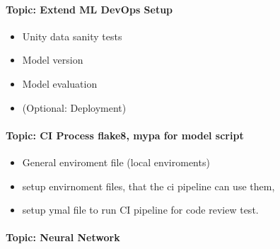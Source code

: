\paragraph{Topic: Extend ML DevOps Setup}
\begin{itemize}
	\item Unity data sanity tests
	\item Model version
	\item Model evaluation
	\item (Optional: Deployment)
\end{itemize}
\paragraph{Topic: CI Process flake8, mypa for model script}
\begin{itemize}
	\item General enviroment file (local enviroments)
	\item setup envirnoment files, that the ci pipeline can use them,
	\item setup ymal file to run CI pipeline for code review test.
\end{itemize}

\paragraph{Topic: Neural Network}






